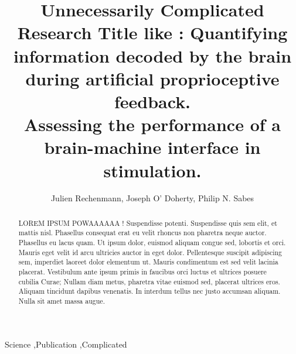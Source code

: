 \documentclass[preprint,12pt]{elsarticle}
\begin{document}
\begin{frontmatter}


\title{Unnecessarily Complicated Research Title like : Quantifying information decoded by the brain during artificial proprioceptive feedback. \\ Assessing the performance of a brain-machine interface in stimulation.}




\author{Julien Rechenmann, Joseph O' Doherty, Philip N. Sabes}

\address{University of California San Francisco (UCSF) \\ Ecole Polytechnique Federale de Lausanne (EPFL)}

\begin{abstract}
LOREM IPSUM POWAAAAAA !
Suspendisse potenti. Suspendisse quis sem elit, et mattis nisl. Phasellus consequat erat eu velit rhoncus non pharetra neque auctor. Phasellus eu lacus quam. Ut ipsum dolor, euismod aliquam congue sed, lobortis et orci. Mauris eget velit id arcu ultricies auctor in eget dolor. Pellentesque suscipit adipiscing sem, imperdiet laoreet dolor elementum ut. Mauris condimentum est sed velit lacinia placerat. Vestibulum ante ipsum primis in faucibus orci luctus et ultrices posuere cubilia Curae; Nullam diam metus, pharetra vitae euismod sed, placerat ultrices eros. Aliquam tincidunt dapibus venenatis. In interdum tellus nec justo accumsan aliquam. Nulla sit amet massa augue.
\end{abstract}

\begin{keyword}
Science \sep Publication \sep Complicated


\end{keyword}

\end{frontmatter}
\end{document}
